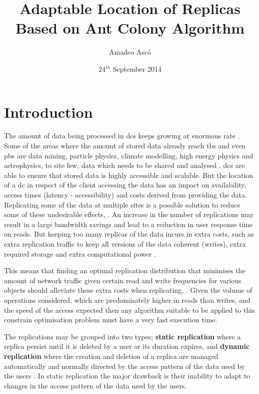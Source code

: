 \documentclass[english]{article}
\begin{document}
\title{Adaptable Location of Replicas Based on Ant Colony Algorithm}

\author{Amadeo Asc\'{o}}

\date{24$^{th}$ September 2014}

\maketitle



\section{Introduction}
	The amount of data being processed in \glspl{dc} keeps growing at enormous rate \cite{Tolle2011a, Cisco2014a, Chanthadavong2014a}. Some of the areas where the amount of stored data already reach \glspl{tb} and even \glspl{pb} are data mining, particle physics, climate modelling, high energy physics and astrophysics, to site few, data which needs to be shared and analysed \cite{KingsyGrace2013a, MohdZin2012a, Naseera2009a}. \glspl{dc} are able to ensure that stored data is highly accessible and scalable. But the location of a \gls{dc} in respect of the client accessing the data has an impact on availability, access times (latency - accessibility) and costs derived from providing the data. Replicating some of the data at multiple sites is a possible solution to reduce some of these undesirable effects, \cite{Briquemont2014a, Abad2011a, Venugopal2006a}. An increase in the number of replications may result in a large bandwidth savings and lead to a reduction in user response time on reads. But keeping too many replicas of the data incurs in extra costs, such as extra replication traffic to keep all versions of the data coherent (writes), extra required storage and extra computational power \cite{Goel2006a}.
	
	This means that finding an optimal replication distribution that minimises the amount of network traffic given certain read and write frequencies for various objects should alleviate these extra costs when replicating, \cite{Wolfson1990a, Briquemont2014a}. Given the volume of operations considered, which are predominately higher in reads than writes, and the speed of the access expected then any algorithm suitable to be applied to this constrain optimisation problem must have a very fast execution time.

	The replications may be grouped into two types; {\bf static replication} where a replica persist until it is deleted by a user or its duration expires, and {\bf dynamic replication} where the creation and deletion of a replica are managed automatically and normally directed by the access pattern of the data used by the users \cite{Dong2008a}. In static replication the major drawback is their inability to adapt to changes in the access pattern of the data used by the users.
	
\end{document}
